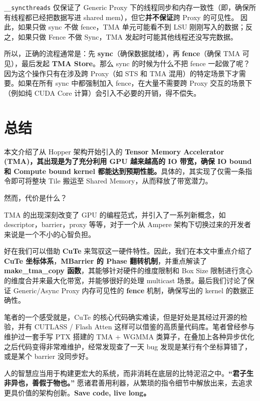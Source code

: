 \verb|__syncthreads| 仅保证了 Generic Proxy 下的线程同步和内存一致性（即，确保所有线程都已经把数据写进 shared mem），但它\textbf{并不保证}跨 Proxy 的可见性。 因此，如果只做 sync 不做 fence，TMA 单元可能看不到 LSU 刚刚写入的数据；反之，如果只做 Fence 不做 Sync，TMA 发起时可能其他线程还没写完数据。

所以，正确的流程通常是：先 \textbf{sync}（确保数据就绪），再 \textbf{fence}（确保 TMA 可见），最后发起 \textbf{TMA Store}。那么 sync 的时候为什么不把 fence 一起做了呢？因为这个操作只有在涉及跨 Proxy（如 STS 和 TMA 混用）的特定场景下才需要。如果在所有 sync 中都强制加入 fence，在大量不需要跨 Proxy 交互的场景下（例如纯 CUDA Core 计算）会引入不必要的开销，得不偿失。

\section{总结}

本文介绍了从 Hopper 架构开始引入的 \textbf{Tensor Memory Accelerator (TMA)，其出现是为了充分利用 GPU 越来越高的 IO 带宽，确保 IO bound 和 Compute bound kernel 都能达到预期性能。}具体的，其实现了仅需一条指令即可将整块 Tile 搬运至 Shared Memory，从而释放了带宽潜力。

然而，代价是什么？

TMA 的出现深刻改变了 GPU 的编程范式，并引入了一系列新概念，如 descriptor，barrier，proxy 等等，对于一个从 Ampere 架构下切换过来的开发者来说是一个不小的心智负担。

好在我们可以借助 \textbf{CuTe} 来驾驭这一硬件特性。因此，我们在本文中重点介绍了\textbf{ CuTe 坐标体系}，\textbf{MBarrier 的 Phase 翻转机制}，并重点解读了 \textbf{make\_tma\_copy 函数}，其能够针对硬件的维度限制和 Box Size 限制进行贪心的维度合并来最大化带宽，并能够很好的处理 multicast 场景。最后我们讨论了保证 Generic/Async Proxy 内存可见性的 \textbf{fence} 机制，确保写出的 kernel 的数据正确性。

笔者的一个感受就是，CuTe 的核心代码确实难读，但是好处是其经过开源的检验，并有 CUTLASS / Flash Atten 这样可以借鉴的高质量代码库。笔者曾经参与维护过一套手写 PTX 搭建的 TMA + WGMMA 类算子，在叠加上各种异步优化之后代码变得非常难维护，经常发现查了一天 bug 发现是某行有个坐标算错了，或是某个 barrier 没同步好。

人的智慧应当用于构建更宏大的系统，而非消耗在底层的比特泥沼之中。\textbf{“君子生非异也，善假于物也。”} 愿诸君善用利器，从繁琐的指令细节中解放出来，去追求更具价值的架构创新。\textbf{Save code, live long。 }
